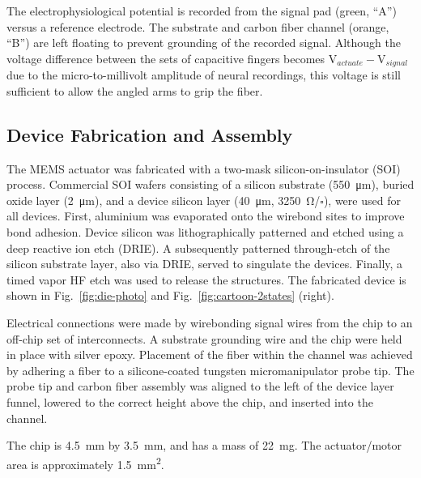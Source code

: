     The electrophysiological potential is recorded from the signal pad (green, ``A'') versus a reference electrode. The substrate and carbon fiber channel (orange, ``B'') are left floating to prevent grounding of the recorded signal. Although the voltage difference between the sets of capacitive fingers becomes V$_{actuate}-$V$_{signal}$ due to the micro-to-millivolt amplitude of neural recordings, this voltage is still sufficient to allow the angled arms to grip the fiber.

\subsection{Device Fabrication and Assembly}
    The MEMS actuator was fabricated with a two-mask silicon-on-insulator (SOI) process. Commercial SOI wafers consisting of a silicon substrate (\SI{550}{\micro\meter}), buried oxide layer (\SI{2}{\micro\meter}), and a device silicon layer (\SI{40}{\micro\meter}, \SI{3250}{\ohm}/$\square$), were used for all devices. First, aluminium was evaporated onto the wirebond sites to improve bond adhesion. Device silicon was lithographically patterned and etched using a deep reactive ion etch (DRIE). A subsequently patterned through-etch of the silicon substrate layer, also via DRIE, served to singulate the devices. Finally, a timed vapor HF etch was used to release the structures. The fabricated device is shown in Fig.~\ref{fig:die-photo} and Fig.~\ref{fig:cartoon-2states} (right).

    Electrical connections were made by wirebonding signal wires from the chip to an off-chip set of interconnects. A substrate grounding wire and the chip were held in place with silver epoxy. Placement of the fiber within the channel was achieved by adhering a fiber to a silicone-coated tungsten micromanipulator probe tip. The probe tip and carbon fiber assembly was aligned to the left of the device layer funnel, lowered to the correct height above the chip, and inserted into the channel. %
    
    The chip is \SI{4.5}{\milli\meter} by \SI{3.5}{\milli\meter}, and has a mass of \SI{22}{\milli\gram}. The actuator/motor area is approximately \SI{1.5}{\square\milli\meter}.
    

